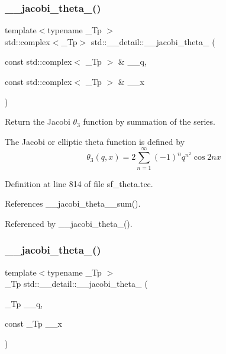 \mbox{\label{namespacestd_1_1____detail_aef309a6de7d2ebab3ee1fcd87dbe6b48}} 
\subsubsection{\texorpdfstring{\+\_\+\+\_\+jacobi\+\_\+theta\+\_()}{\_\_jacobi\_theta\_3()}\hspace{0.1cm}{\footnotesize\ttfamily [1/2]}}
{\footnotesize\ttfamily template$<$typename \+\_\+\+Tp $>$ \\
std\+::complex$<$\+\_\+\+Tp$>$ std\+::\+\_\+\+\_\+detail\+::\+\_\+\+\_\+jacobi\+\_\+theta\+\_ (\begin{DoxyParamCaption}\item[{const std\+::complex$<$ \+\_\+\+Tp $>$ \&}]{\+\_\+\+\_\+q,  }\item[{const std\+::complex$<$ \+\_\+\+Tp $>$ \&}]{\+\_\+\+\_\+x }\end{DoxyParamCaption})}

Return the Jacobi $ \theta_3 $ function by summation of the series.

The Jacobi or elliptic theta function is defined by \[ \theta_3(q,x) = 2\sum_{n=1}^{\infty}(-1)^n q^{n^2}\cos{2nx} \] 

Definition at line 814 of file sf\+\_\+theta.\+tcc.



References \+\_\+\+\_\+jacobi\+\_\+theta\+\_\+\_\+sum().



Referenced by \+\_\+\+\_\+jacobi\+\_\+theta\+\_().

\mbox{\label{namespacestd_1_1____detail_a6a7102085368188062ef47100ce80239}} 
\subsubsection{\texorpdfstring{\+\_\+\+\_\+jacobi\+\_\+theta\+\_()}{\_\_jacobi\_theta\_3()}\hspace{0.1cm}{\footnotesize\ttfamily [2/2]}}
{\footnotesize\ttfamily template$<$typename \+\_\+\+Tp $>$ \\
\+\_\+\+Tp std\+::\+\_\+\+\_\+detail\+::\+\_\+\+\_\+jacobi\+\_\+theta\+\_ (\begin{DoxyParamCaption}\item[{\+\_\+\+Tp}]{\+\_\+\+\_\+q,  }\item[{const \+\_\+\+Tp}]{\+\_\+\+\_\+x }\end{DoxyParamCaption})}

